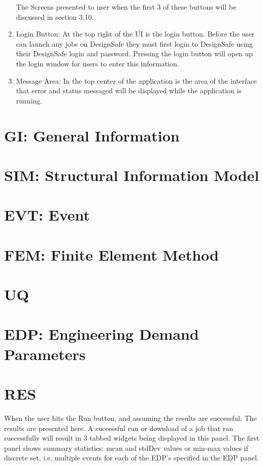 \begin{enumerate}
The Screens presented to user when the first 3 of these buttons will be discussed in section 3.10.

\item Login Button: At the top right of the UI is the login button. Before the user can launch any jobs on DesignSafe they must first login to DesignSafe using their DesignSafe login and password. Pressing the login button will open up the login window for users to enter this information.

\item Message Area: In the top center of the application is the area of the interface that error and status messaged will be displayed while the application is running.

\end{enumerate}

\section{GI: General Information}


\section{SIM: Structural Information Model}


\section{EVT: Event}



\section{FEM: Finite Element Method}


\section{UQ}


\section{EDP: Engineering Demand Parameters}


\section{RES}

When the user hits the Run button, and assuming the results are successful. The results are presented here.  A successful run or download of a job that ran successfully will result in 3 tabbed widgets being displayed in this panel.  The first panel shows summary statistics: mean and stdDev values or min-max values if discrete set, i.e. multiple events for each of the EDP's specified in the EDP panel.

